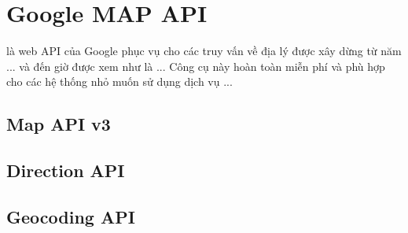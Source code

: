 \documentclass[../thesis.tex]{subfiles}
\begin{document}
\section{Google MAP API}
	là web API của Google phục vụ cho các truy vấn về địa lý được xây dừng từ năm ... và đến giờ được xem như là ... Công cụ này hoàn toàn miễn phí và phù hợp cho các hệ thống nhỏ muốn sử dụng dịch vụ ...
	\subsection{Map API v3}
	\subsection{Direction API}
	\subsection{Geocoding API}
\end{document}

